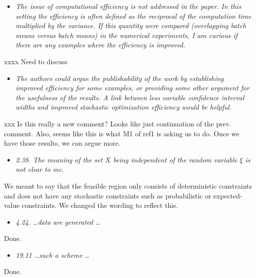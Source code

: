 \documentclass[11pt,notitlepage,onecolumn]{article}
\newcommand{\noi}{\noindent}
\begin{document}
\begin{itemize}
\item[] \textit{The issue of computational efficiency is not addressed  in the paper. 
In this setting the efficiency is often defined as the reciprocal of the computation time multiplied by the variance. 
If this quantity were compared (overlapping batch means versus batch means) in the numerical experiments, I am curious if there are any examples where the efficiency is improved.}
\end{itemize}

\noi 
xxxx Need to discuss
\medskip 


\begin{itemize}
\item[] \textit{The authors could argue the publishability of the work by establishing improved efficiency for some examples, or providing some other argument for the usefulness of the results.  
A link between less variable confidence interval widths and improved stochastic optimization efficiency would be helpful.}
\end{itemize}

\noi
xxx  Is this really a new comment?  Looks like just continuation of the prev. comment. 
Also, seems like this is what M1 of ref1 is asking us to do. 
Once we have those results, we can argue more.
\medskip  

\bigskip 


\noi {\bf \large Minor comments:}
\medskip 



\begin{itemize}
\item[] \textit{2.38. The meaning of the set $X$ being independent of the random variable $\xi$ is not clear to me.}
\end{itemize}

\noi 
We meant to say that the feasible region only consists of deterministic constraints and does not have any stochastic constraints such as probabilistic or expected-value constraints. 
We changed the wording to reflect this. 
\medskip 


\begin{itemize}
\item[] \textit{4.24. \ldots data are generated \ldots}
\end{itemize}

\noi 
Done.
\medskip

\begin{itemize}
\item[] \textit{19.11 \ldots such a scheme \ldots}
\end{itemize}

\noi
Done. 
\end{document}
